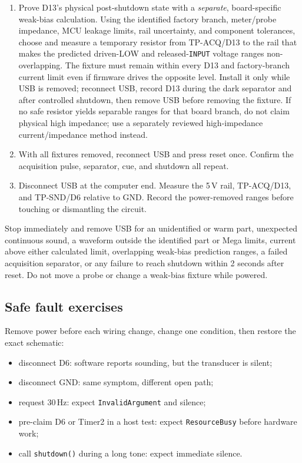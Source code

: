 \documentclass[11pt]{article}
\begin{document}
\begin{enumerate}
          calculated range is the physical high-impedance evidence.
    \item Prove D13's physical post-shutdown state with a \emph{separate},
          board-specific weak-bias calculation. Using the identified factory
          branch, meter/probe impedance, MCU leakage limits, rail uncertainty,
          and component tolerances, choose and measure a temporary resistor
          from TP-ACQ/D13 to the rail that makes the predicted driven-LOW and
          released-\texttt{INPUT} voltage ranges non-overlapping. The fixture
          must remain within every D13 and factory-branch current limit even if
          firmware drives the opposite level. Install it only while USB is
          removed; reconnect USB, record D13 during the dark separator and
          after controlled shutdown, then remove USB before removing the
          fixture. If no safe resistor yields separable ranges for that board
          branch, do not claim physical high impedance; use a separately
          reviewed high-impedance current/impedance method instead.
    \item With all fixtures removed, reconnect USB and press reset once. Confirm
          the acquisition pulse, separator, cue, and shutdown all repeat.
    \item Disconnect USB at the computer end. Measure the 5\,V rail,
          TP-ACQ/D13, and TP-SND/D6 relative to GND. Record the power-removed
          ranges before touching or dismantling the circuit.
\end{enumerate}

Stop immediately and remove USB for an unidentified or warm part, unexpected
continuous sound, a waveform outside the identified part or Mega limits,
current above either calculated limit, overlapping weak-bias prediction ranges,
a failed acquisition separator, or any failure to reach shutdown within
2 seconds after reset. Do not move a probe or change a weak-bias fixture while
powered.

\subsection{Safe fault exercises}

Remove power before each wiring change, change one condition, then restore the
exact schematic:

\begin{itemize}
    \item disconnect D6: software reports sounding, but the transducer is silent;
    \item disconnect GND: same symptom, different open path;
    \item request 30\,Hz: expect \texttt{InvalidArgument} and silence;
    \item pre-claim D6 or Timer2 in a host test: expect
          \texttt{ResourceBusy} before hardware work;
    \item call \texttt{shutdown()} during a long tone: expect immediate silence.
\end{itemize}
\end{document}
